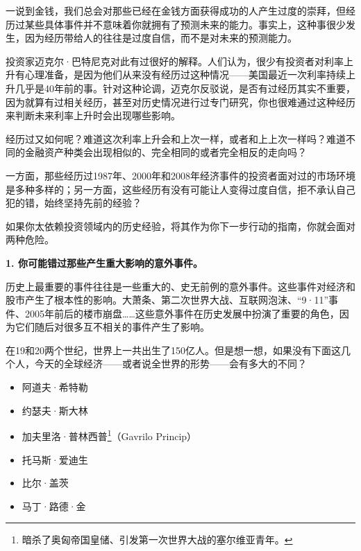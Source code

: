 一说到金钱，我们总会对那些已经在金钱方面获得成功的人产生过度的崇拜，但经历过某些具体事件并不意味着你就拥有了预测未来的能力。事实上，这种事很少发生，因为经历带给人的往往是过度自信，而不是对未来的预测能力。

投资家迈克尔·巴特尼克对此有过很好的解释。人们认为，很少有投资者对利率上升有心理准备，是因为他们从来没有经历过这种情况——美国最近一次利率持续上升几乎是40年前的事。针对这种论调，迈克尔反驳说，是否有过经历其实不重要，因为就算有过相关经历，甚至对历史情况进行过专门研究，你也很难通过这种经历来判断未来利率上升时会出现哪些影响。

{\kaishu

经历过又如何呢？难道这次利率上升会和上次一样，或者和上上次一样吗？难道不同的金融资产种类会出现相似的、完全相同的或者完全相反的走向吗？

一方面，那些经历过1987年、2000年和2008年经济事件的投资者面对过的市场环境是多种多样的；另一方面，这些经历有没有可能让人变得过度自信，拒不承认自己犯的错，始终坚持先前的经验？

}

如果你太依赖投资领域内的历史经验，将其作为你下一步行动的指南，你就会面对两种危险。

\textbf{1. 你可能错过那些产生重大影响的意外事件。}

历史上最重要的事件往往是一些重大的、史无前例的意外事件。这些事件对经济和股市产生了根本性的影响。大萧条、第二次世界大战、互联网泡沫、“9·11”事件、2005年前后的楼市崩盘……这些意外事件在历史发展中扮演了重要的角色，因为它们随后对很多互不相关的事件产生了影响。

在19和20两个世纪，世界上一共出生了150亿人。但是想一想，如果没有下面这几个人，今天的全球经济——或者说全世界的形势——会有多大的不同？

\begin{itemize}

\item 阿道夫·希特勒

\item 约瑟夫·斯大林

\item 加夫里洛·普林西普\footnote{暗杀了奥匈帝国皇储、引发第一次世界大战的塞尔维亚青年。}（Gavrilo Princip）

\item 托马斯·爱迪生

\item 比尔·盖茨

\item 马丁·路德·金

\end{itemize}

